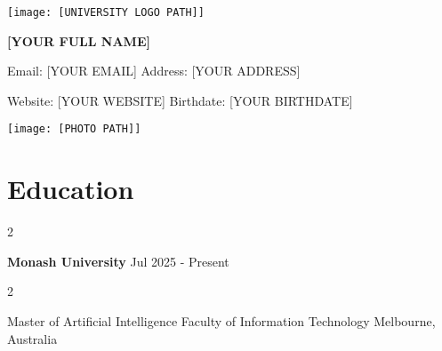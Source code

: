 \documentclass[10pt, a4paper]{article}
\newenvironment{twocolentry}[2][]{
    \onecolentry
    \def\secondColumn{#2}
    \setcolumnwidth{\fill, 4.5 cm}
    \begin{paracol}{2}
}{
    \switchcolumn \raggedleft \secondColumn
    \end{paracol}
    \endonecolentry
} %
\newenvironment{header}{
    \setlength{\topsep}{0pt}\par\kern\topsep\centering\linespread{1.5}
}{
    \par\kern\topsep
} %
\begin{document}
    \setlength{\baselineskip}{1.2\baselineskip}
    \justifying
    
    \newcommand{\AND}{\unskip
        \cleaders\copy\ANDbox\hskip\wd\ANDbox
        \ignorespaces
    }
    \newsavebox\ANDbox
    \sbox\ANDbox{$|$}

    \begin{header}
        \begin{minipage}[t]{0.12\textwidth}
            \vspace{0pt}
            \texttt{[image: [UNIVERSITY LOGO PATH]]}
        \end{minipage}%
        \hfill
        \begin{minipage}[t]{0.65\textwidth}
            \vspace{0.5cm}
            \centering
            \fontsize{24 pt}{24 pt}\selectfont \textbf{[YOUR FULL NAME]}
            
            \vspace{0.4cm}
            
            \fontsize{10 pt}{12 pt}\selectfont
            Email: [YOUR EMAIL] \textbar{} Address: [YOUR ADDRESS]
            
            \vspace{0.1cm}
            Website: [YOUR WEBSITE] \textbar{} Birthdate: [YOUR BIRTHDATE]
        \end{minipage}%
        \hfill
        \begin{minipage}[t]{0.18\textwidth}
            \vspace{0pt}
            \raggedleft
            \texttt{[image: [PHOTO PATH]]}
        \end{minipage}
    \end{header}

    \vspace{5 pt - 0.3 cm}

    \section{Education}

        \begin{twocolentry}{
            Jul 2025 - Present
        }
            \textbf{Monash University}\end{twocolentry}

        \begin{twocolentry}{
            Melbourne, Australia
        }
            Master of Artificial Intelligence Faculty of Information Technology\end{twocolentry}
\end{document}
